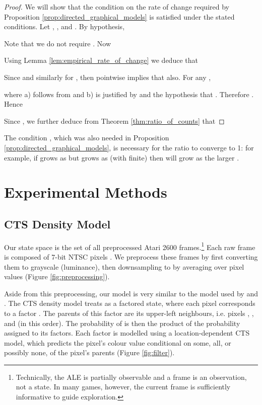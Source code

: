 \documentclass{article}
\begin{document}
{\begin{proof}
We will show that the condition on the rate of change required by Proposition \ref{prop:directed_graphical_models} is satisfied under the stated conditions. 
Let , ,  and .
By hypothesis,

Note that we do not require . Now

Using Lemma \ref{lem:empirical_rate_of_change} we deduce that

Since  and similarly for , then  pointwise implies that  also. For any ,

where a) follows from  and b) is justified by  and the hypothesis that .
Therefore . Hence 

Since , we further deduce from Theorem \ref{thm:ratio_of_counts} that

\end{proof}
The condition , which was also needed in Proposition \ref{prop:directed_graphical_models}, is necessary for the ratio to converge to 1: for example, if  grows as 
but  grows as  (with  finite) then  will grow as the 
larger . 

\section{Experimental Methods}

\subsection{CTS Density Model}

Our state space  is the set of all preprocessed Atari 2600 frames.\footnote{Technically, the ALE is partially observable and a frame is an observation, not a state. In many games, however, the current frame is sufficiently informative to guide exploration.} Each raw frame is composed of
 7-bit NTSC pixels \citep{bellemare13arcade}. We preprocess these frames by
first converting them to grayscale (luminance), then downsampling to  by averaging
over pixel values (Figure \ref{fig:preprocessing}).

\begin{figure*}
\caption{Sample preprocessed image provided to the CTS model (\textbf{right}), along with the original frame (\textbf{left}). Although details are lost, objects can still be made out.\label{fig:preprocessing}}
\end{figure*}

Aside from this preprocessing, our model is very similar to the model used by 
\citet{bellemare14skip} and \citet{veness15compress}.
The CTS density model treats  as a factored state, where each 
pixel corresponds to a factor . The parents of this factor are its 
upper-left neighbours, i.e. pixels , ,  and  (in this order).
The probability of  is then the product of the probability assigned to its factors. Each
factor is modelled using a location-dependent CTS model, which predicts the pixel's colour value
conditional on some, all, or possibly none, of the pixel's parents (Figure \ref{fig:filter}).

}
\end{document}
